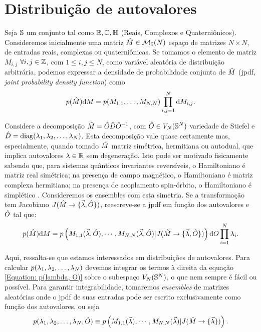 \section{Distribuição de autovalores}

Seja $\mathbb{S}$ um conjunto tal como $\mathbb{R}, \mathbb{C}, \mathbb{H} $ (Reais, Complexos e Quaterniônicos). Consideremos inicialmente uma matriz $\hat M \in \mathcal{M}_{\mathbb{S}}(N)$ espaço de matrizes $N \times N$, de entradas reais, complexas ou quaterniônicas. Se tomamos o elemento de matriz $M_{i,j}$ $\forall i, j \in \mathbb{Z}$, com $1 \leq i, j \leq N$, como variável aleatória de distribuição arbitrária, podemos expressar a densidade de probabilidade conjunta de $\hat M$ (jpdf, \textit{joint probability density function}) como $$p(\hat{M}) \dd M = p(M_{1,1}, \dots, M_{N,N}) \prod_{i,j=1}^{N} \dd M_{i,j}.$$

Considere a decomposição $\hat M = \hat O \hat D \hat O^{-1}$, com $\hat O \in V_N(\mathbb{S}^N)$ variedade de Stiefel e $\hat D = \operatorname{diag}(\lambda_1, \lambda_2, \dots, \lambda_N)$. Esta decomposição vale quase certamente mas, especialmente, quando tomado $\hat M$ matriz simétrica, hermitiana ou autodual, que implica autovalores $\lambda \in \mathbb{R}$ sem degeneração. Isto pode ser motivado fisicamente sabendo que, para sistemas quânticos invariantes reversíveis, o Hamiltoniano é matriz real simétrica; na presença de campo magnético, o Hamiltoniano é matriz complexa hermitiana; na presença de acoplamento spin-órbita, o Hamiltoniano é simplético \cite[Capítulo~2]{RMT-firstcourse-Potters}. Consideremos os ensembles com esta simetria. Se a transformação tem Jacobiano $J(\hat M \rightarrow \{ \vec{\lambda}, \hat O \} )$, reescreve-se a jpdf em função dos autovalores e $\hat O$ tal que:
\begin{equation}
	 p(\hat{M}) \dd M = p \left( M_{1,1}(\vec{\lambda}, \hat O), \cdots, M_{N,N}(\vec{\lambda}, \hat O) | J(\hat M \rightarrow \{ \vec{\lambda}, \hat O \} ) \right) \dd O \prod_{i=1}^{N} \lambda_i.
\label{Equation: p(lambda, O)}
\end{equation}

Aqui, ressalta-se que estamos interessados em distribuições de autovalores. Para calcular $p(\lambda_1, \lambda_2, \dots, \lambda_N)$ devemos integrar os termos à direita da equação \ref{Equation: p(lambda, O)} sobre o subespaço $V_N(\mathbb{S}^N)$, o que nem sempre é fácil ou possível. Para garantir integrabilidade, tomaremos \textit{ensembles} de matrizes aleatórias onde o jpdf de suas entradas pode ser escrito exclusivamente como função dos autovalores, ou seja $$p(\lambda_1, \lambda_2, \dots, \lambda_N, \hat O) \equiv p \left( M_{1,1}(\vec{\lambda}), \cdots, M_{N,N}(\vec{\lambda}) | J(\hat M \rightarrow \{ \vec{\lambda} \} ) \right).$$

